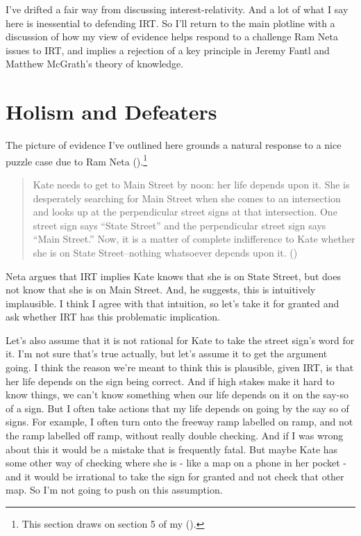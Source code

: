 \documentclass[
  12pt,
  letterpaper,
]{scrbook}
\begin{document}
I've drifted a fair way from discussing interest-relativity. And a lot
of what I say here is inessential to defending IRT. So I'll return to
the main plotline with a discussion of how my view of evidence helps
respond to a challenge Ram Neta issues to IRT, and implies a rejection
of a key principle in Jeremy Fantl and Matthew McGrath's theory of
knowledge.

\section{Holism and Defeaters}\label{sec-neta}

The picture of evidence I've outlined here grounds a natural response to
a nice puzzle case due to Ram Neta
().\footnote{This section draws on section
  5 of my ().}

\begin{quote}
Kate needs to get to Main Street by noon: her life depends upon it. She
is desperately searching for Main Street when she comes to an
intersection and looks up at the perpendicular street signs at that
intersection. One street sign says ``State Street'' and the
perpendicular street sign says ``Main Street.'' Now, it is a matter of
complete indifference to Kate whether she is on State Street--nothing
whatsoever depends upon it. ()
\end{quote}

Neta argues that IRT implies Kate knows that she is on State Street, but
does not know that she is on Main Street. And, he suggests, this is
intuitively implausible. I think I agree with that intuition, so let's
take it for granted and ask whether IRT has this problematic
implication.

Let's also assume that it is not rational for Kate to take the street
sign's word for it. I'm not sure that's true actually, but let's assume
it to get the argument going. I think the reason we're meant to think
this is plausible, given IRT, is that her life depends on the sign being
correct. And if high stakes make it hard to know things, we can't know
something when our life depends on it on the say-so of a sign. But I
often take actions that my life depends on going by the say so of signs.
For example, I often turn onto the freeway ramp labelled on ramp, and
not the ramp labelled off ramp, without really double checking. And if I
was wrong about this it would be a mistake that is frequently fatal. But
maybe Kate has some other way of checking where she is - like a map on a
phone in her pocket - and it would be irrational to take the sign for
granted and not check that other map. So I'm not going to push on this
assumption.
\end{document}
